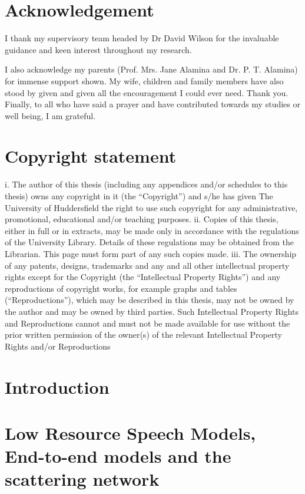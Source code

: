 \documentclass[12pt,twoside]{report}
\begin{document}
\chapter*{Acknowledgement}
I thank my supervisory team headed by Dr David Wilson for the invaluable guidance and keen interest throughout my research.  

I also acknowledge my parents (Prof. Mrs. Jane Alamina and Dr. P. T. Alamina) for immense support shown.  My wife, children and family members have also stood by given and given all the encouragement I could ever need.  Thank you.  Finally, to all who have said a prayer and have contributed towards my studies or well being, I am grateful.

\chapter*{Copyright statement}
i.	The author of this thesis (including any appendices and/or schedules to this thesis) owns any copyright in it (the “Copyright”) and s/he has given The University of Huddersfield the right to use such copyright for any administrative, promotional, educational and/or teaching purposes.
ii.	Copies of this thesis, either in full or in extracts, may be made only in accordance with the regulations of the University Library. Details of these regulations may be obtained from the Librarian. This page must form part of any such copies made.
iii.	The ownership of any patents, designs, trademarks and any and all other intellectual property rights except for the Copyright (the “Intellectual Property Rights”) and any reproductions of copyright works, for example graphs and tables (“Reproductions”), which may be described in this thesis, may not be owned by the author and may be owned by third parties. Such Intellectual Property Rights and Reproductions cannot and must not be made available for use without the prior written permission of the owner(s) of the relevant Intellectual Property Rights and/or Reproductions 


\tableofcontents

\chapter{Introduction}


\chapter{Low Resource Speech Models, End-to-end models and the scattering network}\label{c02}

\end{document}
